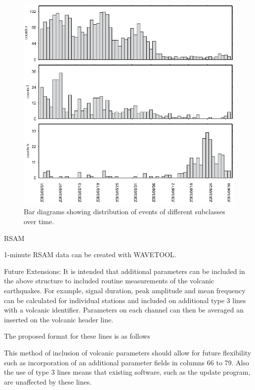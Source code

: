 \begin{figure}
\centerline{\includegraphics[width=0.9\linewidth]{fig/fig46}}
\caption{Bar diagrams showing distribution of events of different subclasses over time.}
\label{fig:volcstat}
\end{figure}

RSAM

1-minute RSAM data can be created with WAVETOOL.

Future Extensions:\newline
It is intended that additional parameters can be included in the above structure to included 
routine measurements of the volcanic earthquakes. For example, signal duration, peak amplitude 
and mean frequency can be calculated for individual stations and included on additional type 3 
lines with a volcanic identifier. Parameters on each channel can then be averaged an inserted 
on the volcanic header line.

The proposed format for these lines is as follows 



This method of inclusion of volcanic parameters should allow for future flexibility such as incorporation of an additional parameter fields in columns 66 to 79. Also the use of type 3 lines means that existing software, such as the update program, are unaffected by these lines. 

